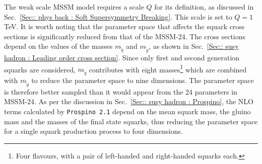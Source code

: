 \documentclass[twoside,english]{uiofysmaster}
\begin{document}
{{The weak scale MSSM model requires a scale $Q$ for its definition, as discussed in Sec.~\ref{Sec:: phys back : Soft Supersymmetry Breaking}. This scale is set to $Q=1$ TeV. It is worth noting that the parameter space that affects the squark cross sections is significantly reduced from that of the MSSM-24. The cross sections depend on the values of the masses $m_{\widetilde{q}}$ and $m_{\widetilde{g}}$, as shown in Sec.~\ref{Sec:: susy hadron : Leading order cross section}. Since only first and second generation squarks are considered, $m_{\widetilde{q}}$ contributes with eight masses\footnote{Four flavours, with a pair of left-handed and right-handed squarks each.} which are combined with $m_{\widetilde{g}}$ to reduce the parameter space to nine dimensions. The parameter space is therefore better sampled than it would appear from the 24 parameters in MSSM-24. As per the discussion in Sec.~\ref{Sec:: susy hadron : Prospino}, the NLO terms calculated by \verb|Prospino 2.1| depend on the mean squark mass, the gluino mass and the masses of the final state squarks, thus reducing the parameter space for a single squark production process to four dimensions.

}}
\end{document}
